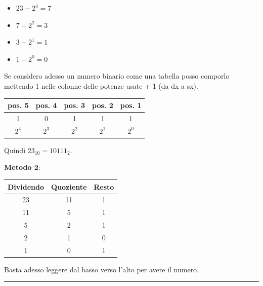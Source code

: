 \documentclass{article}
\begin{document}
    \vspace{2pt}

    \begin{itemize}
    \item$23 - 2^4 = 7$
    \item$7 - 2^2 = 3$
    \item$3 - 2^1 = 1$
    \item$1 - 2^0 = 0$
    \end{itemize}

    \vspace{1pt}

    \noindent Se considero adesso un numero binario come una tabella posso comporlo mettendo 1 nelle colonne delle potenze usate + 1 (da dx a sx).
    
    \begin{table}[ht]
        \centering
        \begin{tabular}{c|c|c|c|c}
            pos. 5 & pos. 4 & pos. 3 & pos. 2 & pos. 1\\
            \hline
            \rule{0pt}{3ex}1 & 0 & 1 & 1 & 1\\
            \hline
            \rule{0pt}{3ex}$2^4$ & $2^3$ &$ 2^2$ & $2^1$ & $2^0$
        \end{tabular}
    \end{table}

    \vspace{1pt}

    \noindent Quindi $23_{10} = 10111_2$.

    \newpage

    \textbf{Metodo 2}:
    
    \begin{table}[ht]
        \centering
        \begin{tabular}{c|c|c}
            Dividendo & Quoziente & Resto\\
            \hline
            \rule{0pt}{3ex}23 & 11 & 1\\
            11 & 5 & 1\\
            5 & 2 & 1\\
            2 & 1 & 0\\
            1 & 0 & 1
        \end{tabular}
    \end{table}

Basta adesso leggere dal basso verso l'alto per avere il numero.

\noindent\rule{\textwidth}{0.5pt}

\vspace{4pt}
\end{document}
